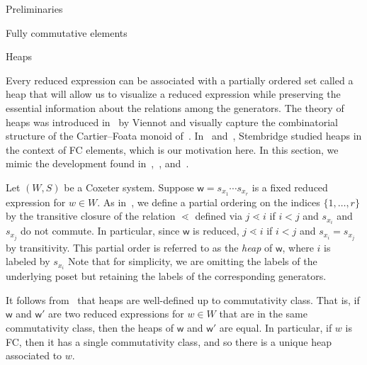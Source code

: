 \documentclass[11pt]{amsart}
\theoremstyle{definition}
\numberwithin{equation}{section}
\newcommand{\C}{\widetilde{C}}
\renewcommand{\(}{\left(}
\renewcommand{\)}{\right)}
\newcommand{\w}{\mathsf{w}}
\begin{document}
\begin{section}{Preliminaries}
\begin{subsection}{Fully commutative elements}

\end{subsection}


\begin{subsection}{Heaps}\label{subsec:heaps}

Every reduced expression can be associated with a partially ordered set called a heap that will allow us to visualize a reduced expression  while preserving the essential information about the relations among the generators.  The theory of heaps was introduced in~\cite{Viennot1986} by Viennot and visually capture the combinatorial structure of the Cartier--Foata monoid of~\cite{Cartier1969}.  In~\cite{Stembridge1996} and~\cite{Stembridge1998}, Stembridge studied heaps in the context of FC elements, which is our motivation here.  In this section, we mimic the development found in~\cite{Billey2007},~\cite{Ernst2010}, and~\cite{Stembridge1996}.

Let $(W,S)$ be a Coxeter system.  Suppose $\w = s_{x_1} \cdots s_{x_r}$ is a fixed reduced expression for $w \in W$.  As in~\cite{Stembridge1996}, we define a partial ordering on the indices $\{1, \dots, r\}$ by the transitive closure of the relation $\lessdot$ defined via $j \lessdot i$ if $i < j$ and $s_{x_i}$ and $s_{x_j}$ do not commute.  In particular, since $\w$ is reduced, $j \lessdot i$ if $i < j$ and $s_{x_i} = s_{x_j}$ by transitivity.  This partial order is referred to as the \emph{heap} of $\w$, where $i$ is labeled by $s_{x_i}$  Note that for simplicity, we are omitting the labels of the underlying poset but retaining the labels of the corresponding generators.

It follows from~\cite[Proposition 2.2]{Stembridge1996} that heaps are well-defined up to commutativity class.  That is, if $\w$ and $\w'$ are two reduced expressions for $w \in W$ that are in the same commutativity class, then the heaps of $\w$ and $\w'$ are equal.  In particular, if $w$ is FC, then it has a single commutativity class, and so there is a unique heap associated to $w$.


\end{subsection}
\end{section}
\end{document}
